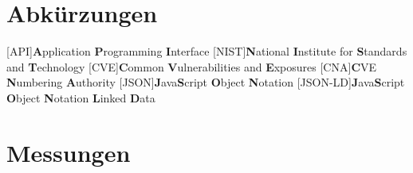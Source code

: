 \documentclass[10pt,a4paper,twoside]{article}
\begin{document}
    \newpage

    
    \newpage
    
    \newpage
    
    \newpage
    
    \newpage
    
    \newpage
    
    \newpage
    
    \newpage
     


    \newpage
    \begin{appendices}
        \section{Abkürzungen} \label{sec:Abkürzungen}
        \begin{acronym}[LangesWortFuerDieEinstellung]
            [API]{\textbf{A}pplication \textbf{P}rogramming \textbf{I}nterface}
            [NIST]{\textbf{N}ational \textbf{I}nstitute for \textbf{S}tandards and \textbf{T}echnology}
            [CVE]{\textbf{C}ommon \textbf{V}ulnerabilities and \textbf{E}xposures}
            [CNA]{\textbf{C}VE \textbf{N}umbering \textbf{A}uthority}
            [JSON]{\textbf{J}ava\textbf{S}cript \textbf{O}bject \textbf{N}otation}
            [JSON-LD]{\textbf{J}ava\textbf{S}cript \textbf{O}bject \textbf{N}otation \textbf{L}inked \textbf{D}ata}
        \end{acronym}
        \newpage
        \section{Messungen} \label{sec:Messungen}
            
            
            
    \end{appendices}

    \newpage
    \printbibheading[title={Quellen}]
    \printbibliography[type=online, heading=subbibliography, title={Links}]

    \newpage
    \listoffigures
    \newpage
    \listoftables
\end{document}
